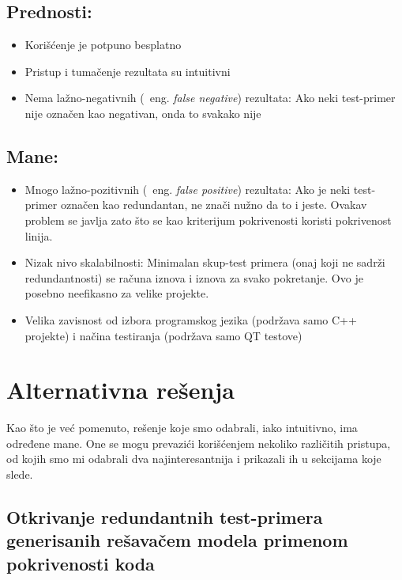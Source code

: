 \documentclass[a4paper]{article}
\begin{document}
\subsection{Prednosti:}
\label{subsec:prednosti}
\begin{itemize}
    \item Korišćenje je potpuno besplatno
    \item Pristup i tumačenje rezultata su intuitivni
    \item Nema lažno-negativnih (~eng. \textit{false negative}) rezultata: Ako neki test-primer nije označen kao negativan, onda to svakako nije
\end{itemize}

\subsection{Mane:}
\label{subsec:mane}
\begin{itemize}
    \item Mnogo lažno-pozitivnih (~eng. \textit{false positive}) rezultata: Ako je neki test-primer označen kao redundantan, ne znači nužno da to i jeste. Ovakav problem se javlja zato što se kao kriterijum pokrivenosti koristi pokrivenost linija.
    \item Nizak nivo skalabilnosti: Minimalan skup-test primera (onaj koji ne sadrži redundantnosti) se računa iznova i iznova za svako pokretanje. Ovo je posebno neefikasno za velike projekte.
    \item Velika zavisnost od izbora programskog jezika (podržava samo C++ projekte) i načina testiranja (podržava samo QT testove) 
\end{itemize}


\section{Alternativna rešenja}
\label{sec:alternative}

Kao što je već pomenuto, rešenje koje smo odabrali, iako intuitivno, ima određene mane. One se mogu prevazići korišćenjem nekoliko različitih pristupa, od kojih smo mi odabrali dva najinteresantnija i prikazali ih u sekcijama koje slede.

\subsection{Otkrivanje redundantnih test-primera generisanih rešavačem modela primenom pokrivenosti koda}
\label{subsec:prvi}
\end{document}
